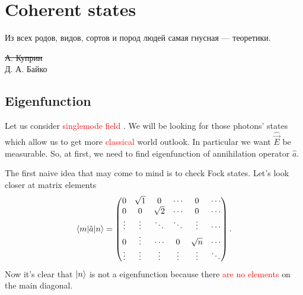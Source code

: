 \section{Coherent states}

\begin{otherlanguage}{russian}
	\epigraph{Из всех родов, видов, сортов и пород людей самая гнусная --- теоретики.}{\sout{А. Куприн} \\Д. А. Байко}
\end{otherlanguage}

\subsection{Eigenfunction}

Let us consider {\textcolor{red}{ singlemode field }}.
 We will be looking for those photons' states which allow us to get more {\textcolor{red} {classical}} world outlook. In particular we want $\hat{\vec{E}}$ be measurable. So, at first, we need to find eigenfunction of annihilation operator $\hat{a}$.

The first naive idea that may come to mind is to check Fock states. Let's look closer at matrix elements
\begin{equation}
	\langle m\rvert \hat{a} \lvert n\rangle =
	\begin{pmatrix}
		0 & \sqrt{1} & 0 &  \cdots  & 0 & \cdots \\
		0 & 0 & \sqrt{2} &  \cdots & 0 & \cdots \\
		\vdots & \vdots & \ddots & \ddots & \vdots  & \cdots \\
		0 & \vdots & \cdots & 0 & \sqrt{n} & \cdots \\
		\vdots & \vdots & \vdots & \vdots & \vdots & \ddots\\
	\end{pmatrix}.
\end{equation}
Now it's clear that {\textcolor{red}{ $\lvert n\rangle$ }}is not a eigenfunction because there {\textcolor{red} {are no elements }}on the main diagonal.

